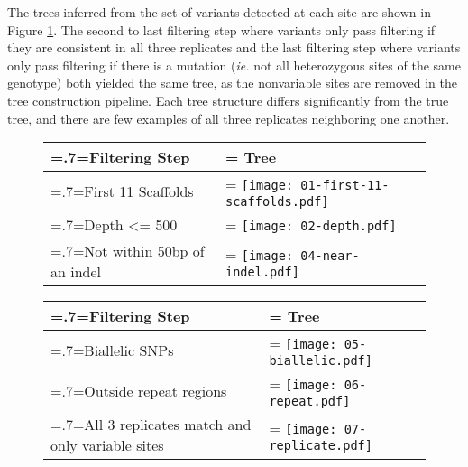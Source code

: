 The trees inferred from the set of variants detected at each site are shown in Figure \ref{fig:ev_filtertrees}. The second to last filtering step where variants only pass filtering if they are consistent in all three replicates and the last filtering step where variants only pass filtering if there is a mutation (\textit{ie.} not all heterozygous sites of the same genotype) both yielded the same tree, as the nonvariable sites are removed in the tree construction pipeline. Each tree structure differs significantly from the true tree, and there are few examples of all three replicates neighboring one another.



\begin{figure}
\centering
\begin{tabularx}{.7\textwidth}{ >{\hsize=.7\hsize\linewidth=\hsize}X >{\hsize=1.3\hsize\linewidth=\hsize}X}
\toprule
Filtering Step & Tree \\
\midrule
First 11 Scaffolds & \texttt{[image: 01-first-11-scaffolds.pdf]} \\
Depth <= 500 & \texttt{[image: 02-depth.pdf]} \\
Not within 50bp of an indel & \texttt{[image: 04-near-indel.pdf]} \\
\bottomrule
\end{tabularx}
\end{figure}

\begin{figure}
\centering
\begin{tabularx}{.7\textwidth}{ >{\hsize=.7\hsize\linewidth=\hsize}X >{\hsize=1.3\hsize\linewidth=\hsize}X }
\toprule
Filtering Step & Tree \\
\midrule
Biallelic SNPs & \texttt{[image: 05-biallelic.pdf]}\\
Outside repeat \newline regions & \texttt{[image: 06-repeat.pdf]} \\
All 3 replicates match and only variable sites & \texttt{[image: 07-replicate.pdf]}\\
\bottomrule
\end{tabularx}
\label{fig:ev_filtertrees}
\end{figure}

